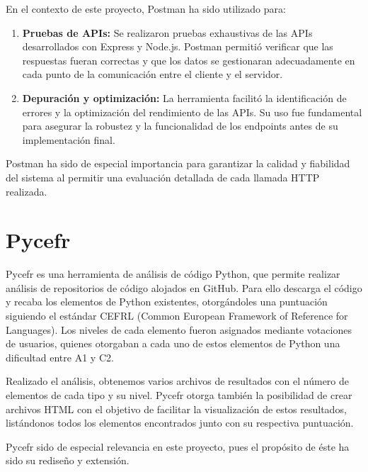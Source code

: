 \documentclass[a4paper, 12pt]{book}
\begin{document}
En el contexto de este proyecto, Postman ha sido utilizado para:

\begin{enumerate}
    \item \textbf{Pruebas de APIs:} Se realizaron pruebas exhaustivas de las APIs desarrollados con Express y Node.js. Postman permitió verificar que las respuestas fueran correctas y que los datos se gestionaran adecuadamente en cada punto de la comunicación entre el cliente y el servidor.
    \item \textbf{Depuración y optimización:} La herramienta facilitó la identificación de errores y la optimización del rendimiento de las APIs. Su uso fue fundamental para asegurar la robustez y la funcionalidad de los endpoints antes de su implementación final.
\end{enumerate}

Postman ha sido de especial importancia para garantizar la calidad y fiabilidad del sistema al permitir una evaluación detallada de cada llamada HTTP realizada.

\section{Pycefr}

Pycefr es una herramienta de análisis de código Python, que permite realizar análisis de repositorios de código alojados en GitHub. Para ello descarga el código y recaba los elementos de Python existentes, otorgándoles una puntuación siguiendo el estándar CEFRL (Common European Framework of Reference for Languages). Los niveles de cada elemento fueron asignados mediante votaciones de usuarios, quienes otorgaban a cada uno de estos elementos de Python una dificultad entre A1 y C2.

Realizado el análisis, obtenemos varios archivos de resultados con el número de elementos de cada tipo y su nivel. Pycefr otorga también la posibilidad de crear archivos HTML con el objetivo de facilitar la visualización de estos resultados, listándonos todos los elementos encontrados junto con su respectiva puntuación.

Pycefr sido de especial relevancia en este proyecto, pues el propósito de éste ha sido su rediseño y extensión.


\label{sec:seccion1}

\end{document}
